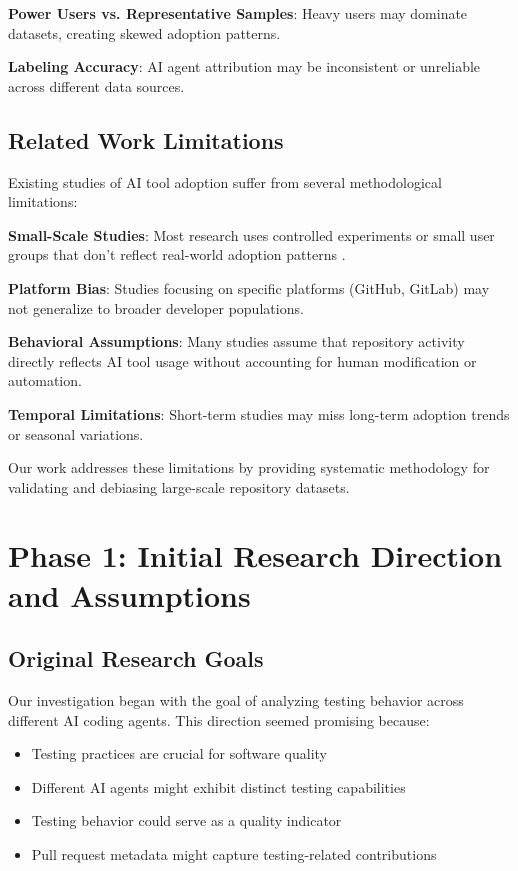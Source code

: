 \documentclass[conference]{IEEEtran}
\begin{document}
\textbf{Power Users vs. Representative Samples}: Heavy users may dominate datasets, creating skewed adoption patterns.

\textbf{Labeling Accuracy}: AI agent attribution may be inconsistent or unreliable across different data sources.

\subsection{Related Work Limitations}

Existing studies of AI tool adoption suffer from several methodological limitations:

\textbf{Small-Scale Studies}: Most research uses controlled experiments or small user groups that don't reflect real-world adoption patterns \cite{bareiß2023code}.

\textbf{Platform Bias}: Studies focusing on specific platforms (GitHub, GitLab) may not generalize to broader developer populations.

\textbf{Behavioral Assumptions}: Many studies assume that repository activity directly reflects AI tool usage without accounting for human modification or automation.

\textbf{Temporal Limitations}: Short-term studies may miss long-term adoption trends or seasonal variations.

Our work addresses these limitations by providing systematic methodology for validating and debiasing large-scale repository datasets.

\section{Phase 1: Initial Research Direction and Assumptions}

\subsection{Original Research Goals}

Our investigation began with the goal of analyzing testing behavior across different AI coding agents. This direction seemed promising because:

\begin{itemize}
    \item Testing practices are crucial for software quality
    \item Different AI agents might exhibit distinct testing capabilities
    \item Testing behavior could serve as a quality indicator
    \item Pull request metadata might capture testing-related contributions
\end{itemize}
\end{document}
